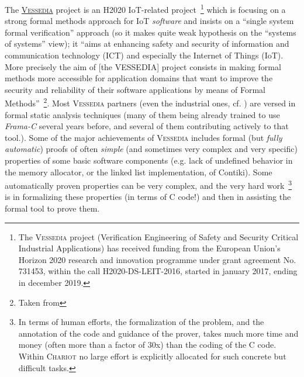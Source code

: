 The \href{http://vessedia.eu/}{\textsc{Vessedia}}  project is an H2020
IoT-related project~\footnote{The \textsc{Vessedia} project (Verification
  Engineering of Safety and Security Critical Industrial Applications)
  has received funding from the European Union's Horizon 2020 research
  and innovation programme under grant agreement No. 731453, within
  the call H2020-DS-LEIT-2016, started in january 2017, ending in
  december 2019.} which is focusing on a strong formal methods
approach for IoT \emph{software} and insists on a ``single system
formal verification'' approach (so it makes quite weak hypothesis on
the ``systems of systems'' view); it ``aims at enhancing safety and
security of information and communication technology (ICT) and
especially the Internet of Things (IoT). More precisely the aim of
[the VESSEDIA] project consists in making formal methods more
accessible for application domains that want to improve the security
and reliability of their software applications by means of Formal
Methods''~\footnote{Taken from
  }. Most \textsc{Vessedia} partners
(even the industrial ones, cf. \cite{Berkes:2018:Vessedia-approach}) are versed in formal static analysis
techniques (many of them being already trained to use \emph{Frama-C}
several years before, and several of them contributing actively to
that tool.). Some of the major achievements of \textsc{Vessedia}
includes formal (but \emph{fully automatic}) proofs of often
\emph{simple} (and sometimes very complex and very specific)
properties of some basic software components (e.g. lack of undefined
behavior in the memory allocator, or the linked list implementation,
of Contiki). Some automatically proven properties can be very complex,
and the very hard work~\footnote{In terms of human efforts, the
  formalization of the problem, and the annotation of the code and
  guidance of the prover, takes much more time and money (often more
  than a factor of 30x) than the coding of the C code. Within
  \textsc{Chariot} no large effort is explicitly allocated for such
  concrete but difficult tasks.}  is in formalizing these properties
(in terms of C code!)  and then in assisting the formal tool to prove
them.


